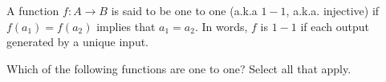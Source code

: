 \documentclass{ximera}
\begin{document}
\begin{definition}
A function $f:A \to B$ is said to be one to one (a.k.a $1-1$, a.k.a. injective) if $f(a_1) = f(a_2)$ implies that $a_1 = a_2$.  In words, $f$ is $1-1$ if each output generated by a unique input.
\end{definition}

\begin{question}
Which of the following functions are one to one?  Select all that apply.

\begin{selectAll}
\end{selectAll}

\end{question}

\begin{question}
\end{question}
\end{document}
